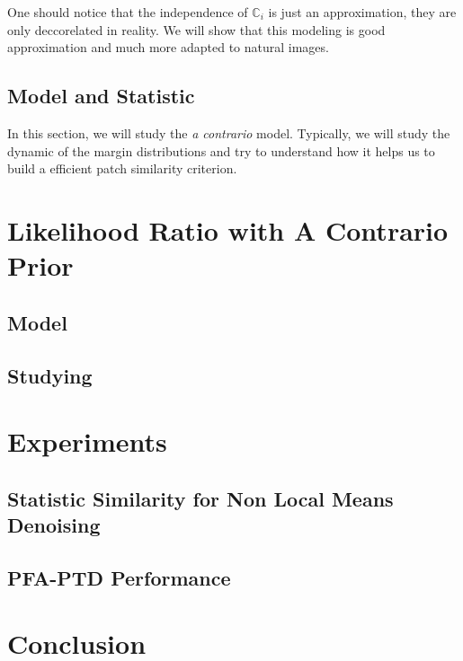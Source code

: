 \documentclass[runningheads]{llncs}
\newcommand{\rand}[1]{\ensuremath{\mathbb{#1}}}
\begin{document}
One should notice that the independence of $\rand{C}_i$ is just an approximation, they are only deccorelated in reality. We will show that this modeling is good approximation and much more adapted to natural images.

\subsection{Model and Statistic}

In this section, we will study the \textit{a contrario} model. Typically, we will study the dynamic of the margin distributions and try to understand how it helps us to build a efficient patch similarity criterion.
\section{Likelihood Ratio with A Contrario Prior}
\subsection{Model}
\subsection{Studying}

\section{Experiments}
\subsection{Statistic Similarity for Non Local Means Denoising}
\subsection{PFA-PTD Performance}
\section{Conclusion}

\newpage



\end{document}
